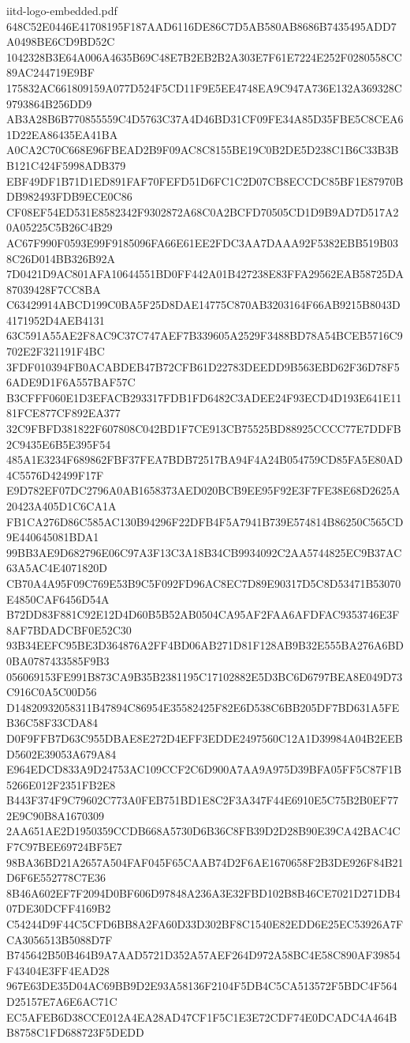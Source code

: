 \begin{filecontents*}[overwrite]{iitd-logo-embedded.pdf}
648C52E0446E41708195F187AAD6116DE86C7D5AB580AB8686B7435495ADD7A0498BE6CD9BD52C
1042328B3E64A006A4635B69C48E7B2EB2B2A303E7F61E7224E252F0280558CC89AC244719E9BF
175832AC661809159A077D524F5CD11F9E5EE4748EA9C947A736E132A369328C9793864B256DD9
AB3A28B6B770855559C4D5763C37A4D46BD31CF09FE34A85D35FBE5C8CEA61D22EA86435EA41BA
A0CA2C70C668E96FBEAD2B9F09AC8C8155BE19C0B2DE5D238C1B6C33B3BB121C424F5998ADB379
EBF49DF1B71D1ED891FAF70FEFD51D6FC1C2D07CB8ECCDC85BF1E87970BDB982493FDB9ECE0C86
CF08EF54ED531E8582342F9302872A68C0A2BCFD70505CD1D9B9AD7D517A20A05225C5B26C4B29
AC67F990F0593E99F9185096FA66E61EE2FDC3AA7DAAA92F5382EBB519B038C26D014BB326B92A
7D0421D9AC801AFA10644551BD0FF442A01B427238E83FFA29562EAB58725DA87039428F7CC8BA
C63429914ABCD199C0BA5F25D8DAE14775C870AB3203164F66AB9215B8043D4171952D4AEB4131
63C591A55AE2F8AC9C37C747AEF7B339605A2529F3488BD78A54BCEB5716C9702E2F321191F4BC
3FDF010394FB0ACABDEB47B72CFB61D22783DEEDD9B563EBD62F36D78F56ADE9D1F6A557BAF57C
B3CFFF060E1D3EFACB293317FDB1FD6482C3ADEE24F93ECD4D193E641E1181FCE877CF892EA377
32C9FBFD381822F607808C042BD1F7CE913CB75525BD88925CCCC77E7DDFB2C9435E6B5E395F54
485A1E3234F689862FBF37FEA7BDB72517BA94F4A24B054759CD85FA5E80AD4C5576D42499F17F
E9D782EF07DC2796A0AB1658373AED020BCB9EE95F92E3F7FE38E68D2625A20423A405D1C6CA1A
FB1CA276D86C585AC130B94296F22DFB4F5A7941B739E574814B86250C565CD9E440645081BDA1
99BB3AE9D682796E06C97A3F13C3A18B34CB9934092C2AA5744825EC9B37AC63A5AC4E4071820D
CB70A4A95F09C769E53B9C5F092FD96AC8EC7D89E90317D5C8D53471B53070E4850CAF6456D54A
B72DD83F881C92E12D4D60B5B52AB0504CA95AF2FAA6AFDFAC9353746E3F8AF7BDADCBF0E52C30
93B34EEFC95BE3D364876A2FF4BD06AB271D81F128AB9B32E555BA276A6BD0BA0787433585F9B3
056069153FE991B873CA9B35B2381195C17102882E5D3BC6D6797BEA8E049D73C916C0A5C00D56
D14820932058311B47894C86954E35582425F82E6D538C6BB205DF7BD631A5FEB36C58F33CDA84
D0F9FFB7D63C955DBAE8E272D4EFF3EDDE2497560C12A1D39984A04B2EEBD5602E39053A679A84
E964EDCD833A9D24753AC109CCF2C6D900A7AA9A975D39BFA05FF5C87F1B5266E012F2351FB2E8
B443F374F9C79602C773A0FEB751BD1E8C2F3A347F44E6910E5C75B2B0EF772E9C90B8A1670309
2AA651AE2D1950359CCDB668A5730D6B36C8FB39D2D28B90E39CA42BAC4CF7C97BEE69724BF5E7
98BA36BD21A2657A504FAF045F65CAAB74D2F6AE1670658F2B3DE926F84B21D6F6E552778C7E36
8B46A602EF7F2094D0BF606D97848A236A3E32FBD102B8B46CE7021D271DB407DE30DCFF4169B2
C54244D9F44C5CFD6BB8A2FA60D33D302BF8C1540E82EDD6E25EC53926A7FCA3056513B5088D7F
B745642B50B464B9A7AAD5721D352A57AEF264D972A58BC4E58C890AF39854F43404E3FF4EAD28
967E63DE35D04AC69BB9D2E93A58136F2104F5DB4C5CA513572F5BDC4F564D25157E7A6E6AC71C
EC5AFEB6D38CCE012A4EA28AD47CF1F5C1E3E72CDF74E0DCADC4A464BB8758C1FD688723F5DEDD

\end{filecontents*}
